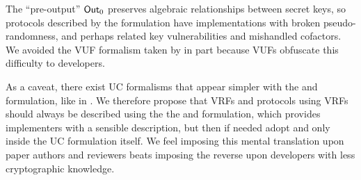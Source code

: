 The ``pre-output'' ${\mathsf{Out}}_0$ preserves algebraic relationships between
secret keys, so protocols described by the  formulation
have implementations with broken pseudo-randomness, and perhaps
 related key vulnerabilities and mishandled cofactors.
We avoided the VUF formalism taken by \cite{agg_dkg} in part because
 VUFs obfuscate this difficulty to developers.

As a caveat, there exist UC formalisms that appear simpler with
the  and  formulation, like in \cite{praos}.
We therefore propose that VRFs and protocols using VRFs should always be
described using the the \Sign and \Verify formulation, which provides
implementers with a sensible description, but then if needed adopt
  and  only inside the UC formulation itself.
We feel imposing this mental translation upon paper authors and reviewers
 beats imposing the reverse upon developers with less cryptographic knowledge.



\endinput 



\smallskip

There exist VUFs like RSA-FDH or BLS signatures that lack auxiliary data
Yet, these all suffer from either large signature sizes (RSA) or
 slow verification (BLS).

Instead, one prefers instantiating VRFs similarly to
 \cite{nsec5} or \cite{VXEd25519} using Chaum-Pedersen DLEQ proofs \cite{CP92} %
 because they provide both small signatures and fast verification.
In these, our auxiliary data \aux can be verified for free,
by binding \aux into the challenge hash, like a Schnorr signature.
VRF protocols could often reduce bandwidth and verifier time this way,
 but some like Sassafras depend upon \aux. 





\endinput %






Also, pseudo-randomness in \cite{vrf_micali} merges \Eval and \Sign.















